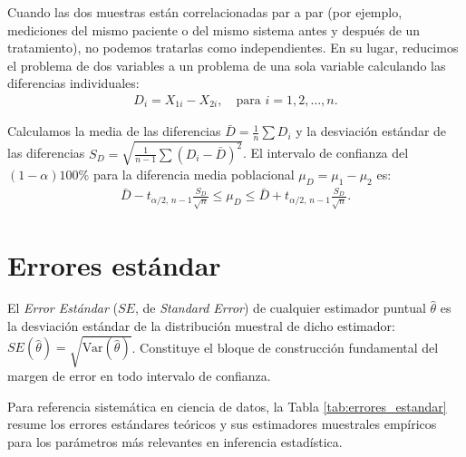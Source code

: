 \begin{definicion}
	Cuando las dos muestras están correlacionadas par a par (por ejemplo, mediciones del mismo paciente o del mismo sistema antes y después de un tratamiento), no podemos tratarlas como independientes. En su lugar, reducimos el problema de dos variables a un problema de una sola variable calculando las diferencias individuales:
	\begin{align}
		D_i = X_{1i} - X_{2i}, \quad \text{para } i = 1, 2, \ldots, n.
	\end{align}
	
	Calculamos la media de las diferencias $\bar{D} = \frac{1}{n}\sum D_i$ y la desviación estándar de las diferencias $S_D = \sqrt{\frac{1}{n-1}\sum (D_i - \bar{D})^2}$. El intervalo de confianza del $(1-\alpha)100\%$ para la diferencia media poblacional $\mu_D = \mu_1 - \mu_2$ es:
	\begin{align}
		\bar{D} - t_{\alpha/2, \, n-1} \frac{S_D}{\sqrt{n}} \leq \mu_D \leq \bar{D} + t_{\alpha/2, \, n-1} \frac{S_D}{\sqrt{n}}.
	\end{align}
\end{definicion}

\section{Errores estándar}

El \emph{Error Estándar} ($SE$, de \emph{Standard Error}) de cualquier estimador puntual $\hat{\theta}$ es la desviación estándar de la distribución muestral de dicho estimador: $SE(\hat{\theta}) = \sqrt{\text{Var}(\hat{\theta})}$. Constituye el bloque de construcción fundamental del margen de error en todo intervalo de confianza.

Para referencia sistemática en ciencia de datos, la Tabla \ref{tab:errores_estandar} resume los errores estándares teóricos y sus estimadores muestrales empíricos para los parámetros más relevantes en inferencia estadística.

